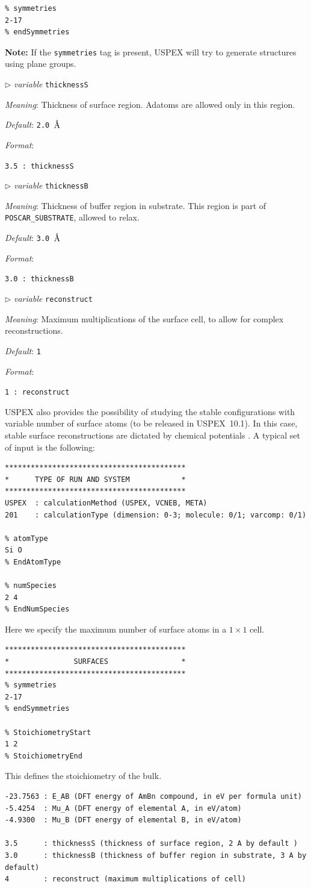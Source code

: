 \documentclass[12pt]{article}
\newcommand{\keyword}[1]{\texttt{#1}}
\newcommand{\file}[1]{\texttt{#1}}
\newcommand{\paramacro}[6]{
\vspace{0.5cm}
$\triangleright$ \emph{variable} {\color{blue} \texttt{#1}}

\emph{Meaning}: {#2}

{#3}

\emph{Default}: \texttt{#4}

\emph{Format}:

{\addtolength{\leftskip}{10mm} 
\texttt{#5}
\par}


{\small #6}

}
\begin{document}
\begin{verbatim}
% symmetries
2-17
% endSymmetries
\end{verbatim}

\textbf{Note:} If the \keyword{symmetries} tag is present, USPEX will try to
generate structures using plane groups.

\paramacro{thicknessS}{Thickness of surface region. Adatoms are allowed only in
this region.}{}{2.0 \rm $\text{\r{A}}$}{3.5 : thicknessS}{}

\paramacro{thicknessB}{Thickness of buffer region in substrate. This region is
part of \file{POSCAR\_SUBSTRATE}, allowed to relax.}{}{3.0 \rm
$\text{\r{A}}$}{3.0 : thicknessB}{}

\paramacro{reconstruct}{Maximum multiplications of the surface cell, to allow
for complex reconstructions.}{}{1}{1 : reconstruct}{}

\vspace{0.5 cm}

USPEX also provides the possibility of studying the stable configurations with
variable number of surface atoms (to be released in USPEX~10.1). In this case,
stable surface reconstructions are dictated by chemical potentials
\cite{Zhu2013}. A typical set of input is the following:

\begin{verbatim}
******************************************
*      TYPE OF RUN AND SYSTEM            *
******************************************
USPEX  : calculationMethod (USPEX, VCNEB, META)
201    : calculationType (dimension: 0-3; molecule: 0/1; varcomp: 0/1)

% atomType
Si O
% EndAtomType

% numSpecies
2 4
% EndNumSpecies
\end{verbatim}

Here we specify the maximum number of surface atoms in a $1 \times 1$ cell.

\begin{verbatim}
******************************************
*               SURFACES                 *
******************************************
% symmetries
2-17
% endSymmetries

% StoichiometryStart
1 2
% StoichiometryEnd
\end{verbatim}

This defines the stoichiometry of the bulk.

\begin{verbatim}
-23.7563 : E_AB (DFT energy of AmBn compound, in eV per formula unit)
-5.4254  : Mu_A (DFT energy of elemental A, in eV/atom)
-4.9300  : Mu_B (DFT energy of elemental B, in eV/atom)

3.5      : thicknessS (thickness of surface region, 2 A by default )
3.0      : thicknessB (thickness of buffer region in substrate, 3 A by default)
4        : reconstruct (maximum multiplications of cell)
\end{verbatim}
\end{document}
